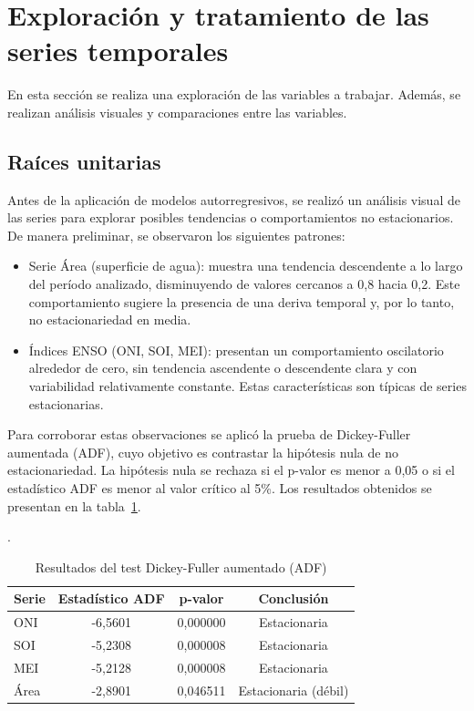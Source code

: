 \section{Exploración y tratamiento de las series temporales}
En esta sección se realiza una exploración de las variables a trabajar. Además, se realizan análisis visuales y comparaciones entre las variables. 

\subsection{Raíces unitarias}

Antes de la aplicación de modelos autorregresivos, se realizó un análisis visual de las 
series para explorar posibles tendencias o comportamientos no estacionarios. De manera 
preliminar, se observaron los siguientes patrones:

\begin{itemize}
    \item Serie Área (superficie de agua): muestra una tendencia descendente a lo 
    largo del período analizado, disminuyendo de valores cercanos a 0,8 hacia 0,2. Este 
    comportamiento sugiere la presencia de una deriva temporal y, por lo tanto, 
    no estacionariedad en media.
    \item Índices ENSO (ONI, SOI, MEI): presentan un comportamiento oscilatorio 
    alrededor de cero, sin tendencia ascendente o descendente clara y con variabilidad 
    relativamente constante. Estas características son típicas de series estacionarias.
\end{itemize}

Para corroborar estas observaciones se aplicó la prueba de Dickey-Fuller aumentada (ADF), cuyo objetivo es contrastar la hipótesis nula de no estacionariedad. La hipótesis nula se rechaza si el p-valor es menor a 0,05 o si el estadístico ADF es menor al valor crítico al 5\%. Los resultados obtenidos se presentan en la tabla~\ref{tab:adf_test}.

\begin{table}[H]
    \centering
    \caption{Resultados del test Dickey-Fuller aumentado (ADF)}.
    \label{tab:adf_test}
    \begin{tabular}{lccc}
        \toprule
        \textbf{Serie} & \textbf{Estadístico ADF} & \textbf{p-valor} & \textbf{Conclusión} \\
        \midrule
        ONI  & -6,5601 & 0,000000 & Estacionaria \\
        SOI  & -5,2308 & 0,000008 & Estacionaria \\
        MEI  & -5,2128 & 0,000008 & Estacionaria \\
        Área & -2,8901 & 0,046511 & Estacionaria (débil) \\
        \bottomrule
    \end{tabular}
\end{table}


